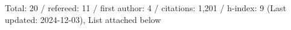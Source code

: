 Total: 20 / refereed: 11 / first author: 4 / citations: 1,201 / h-index: 9 (Last updated: 2024-12-03), List attached below